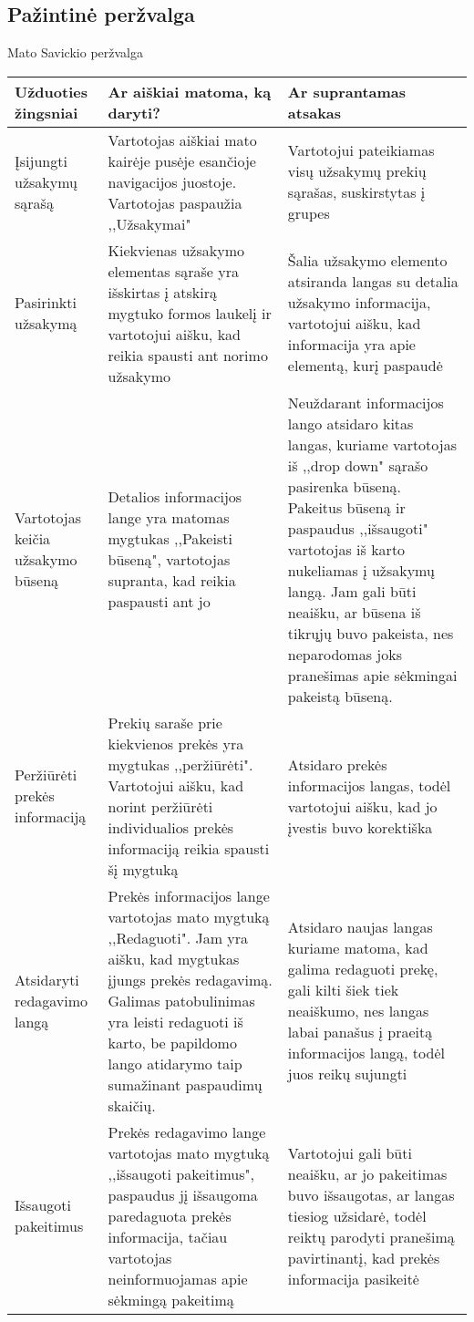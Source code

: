 \documentclass[oneside]{VUMIFPSkursinis}
\begin{document}
	\subsection{Pažintinė peržvalga}
Mato Savickio peržvalga
\begin{center}
    \begin{tabular}{ |p{4cm}| p{6cm} | p{7cm} | }
    \hline
    	Užduoties žingsniai & Ar aiškiai matoma, ką daryti? & Ar suprantamas atsakas \\ \hline 
	Įsijungti užsakymų sąrašą & Vartotojas aiškiai mato kairėje pusėje esančioje navigacijos juostoje.
					Vartotojas paspaužia ,,Užsakymai" & Vartotojui pateikiamas visų užsakymų prekių sąrašas, suskirstytas į grupes \\ \hline
	Pasirinkti užsakymą & Kiekvienas užsakymo elementas sąraše yra išskirtas į atskirą mygtuko formos laukelį ir vartotojui aišku, kad reikia spausti ant norimo užsakymo & Šalia užsakymo elemento atsiranda langas su detalia užsakymo informacija, vartotojui aišku, kad informacija yra apie elementą, kurį paspaudė \\ \hline
	Vartotojas keičia užsakymo būseną & Detalios informacijos lange yra matomas mygtukas ,,Pakeisti būseną", vartotojas supranta, kad reikia paspausti ant jo & Neuždarant informacijos lango atsidaro kitas langas, kuriame vartotojas iš ,,drop down" sąrašo pasirenka būseną.  Pakeitus būseną ir paspaudus ,,išsaugoti" vartotojas iš karto nukeliamas į užsakymų langą.
Jam gali būti neaišku, ar būsena iš tikrųjų buvo pakeista, nes neparodomas joks pranešimas apie sėkmingai pakeistą būseną. \\ \hline

	Peržiūrėti prekės informaciją & Prekių saraše prie kiekvienos prekės yra mygtukas ,,peržiūrėti".
	Vartotojui aišku, kad norint peržiūrėti individualios prekės informaciją reikia spausti šį mygtuką & Atsidaro prekės informacijos langas, todėl vartotojui aišku, kad jo įvestis buvo korektiška \\ \hline

	Atsidaryti redagavimo langą & Prekės informacijos lange vartotojas mato mygtuką ,,Redaguoti".
	Jam yra aišku, kad mygtukas įjungs prekės redagavimą. Galimas patobulinimas yra leisti redaguoti iš karto, be papildomo lango atidarymo taip sumažinant paspaudimų skaičių. 
	& Atsidaro naujas langas kuriame matoma, kad galima redaguoti prekę, gali kilti šiek tiek neaiškumo, nes langas labai panašus į praeitą informacijos langą, todėl juos reikų sujungti \\ \hline

	Išsaugoti pakeitimus & Prekės redagavimo lange vartotojas  mato mygtuką ,,išsaugoti pakeitimus", paspaudus jį išsaugoma paredaguota prekės informacija, tačiau vartotojas neinformuojamas apie sėkmingą pakeitimą & Vartotojui gali būti neaišku, ar jo pakeitimas buvo išsaugotas, ar langas tiesiog užsidarė, todėl reiktų parodyti pranešimą pavirtinantį, kad prekės informacija pasikeitė \\ \hline
   \hline
    \end{tabular}
\end{center}
\end{document}
